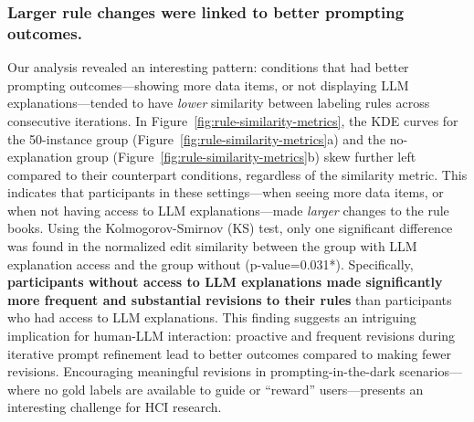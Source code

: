 \subsubsection{Larger rule changes were linked to better prompting outcomes.}
Our analysis revealed an interesting pattern: 
conditions that had better prompting outcomes---showing more data items, or not displaying LLM explanations---tended to have \textit{lower} similarity between labeling rules across consecutive iterations. 
In Figure~\ref{fig:rule-similarity-metrics}, the KDE curves for the 50-instance group (Figure~\ref{fig:rule-similarity-metrics}a) and the no-explanation group (Figure~\ref{fig:rule-similarity-metrics}b) skew further left compared to their counterpart conditions, regardless of the similarity metric. 
This indicates that participants in these settings---when seeing more data items, or when not having access to LLM explanations---made \textit{larger} changes to the rule books.
Using the Kolmogorov-Smirnov (KS) test, only one significant difference was found in the normalized edit similarity between the group with LLM explanation access and the group without (p-value=0.031*). Specifically, \textbf{participants without access to LLM explanations made significantly more frequent and substantial revisions to their rules} than participants who had access to LLM explanations.
This finding suggests an intriguing implication for human-LLM interaction: 
proactive and frequent revisions during iterative prompt refinement lead to better outcomes compared to making fewer revisions.
Encouraging meaningful revisions in prompting-in-the-dark scenarios---where no gold labels are available to guide or ``reward'' users---presents an interesting challenge for HCI research.





















